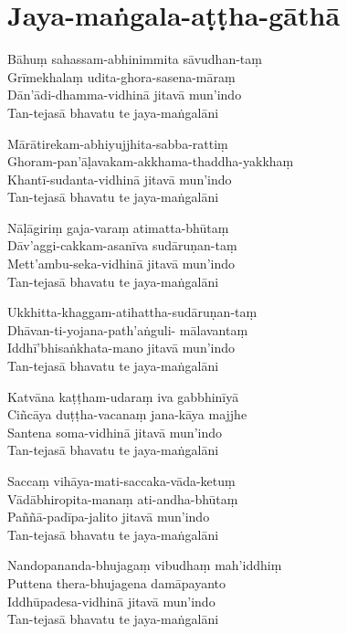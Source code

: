 
\clearpage

\chapter{Jaya-maṅgala-aṭṭha-gāthā}%


\begin{paritta}
Bāhuṃ sahassam-abhinimmita sāvudhan-taṃ\\
Grīmekhalaṃ udita-ghora-sasena-māraṃ\\
Dān'ādi-dhamma-vidhinā jitavā mun'indo\\
Tan-tejasā bhavatu te jaya-maṅgalāni

Mārātirekam-abhiyujjhita-sabba-rattiṃ\\
Ghoram-pan'āḷavakam-akkhama-thaddha-yakkhaṃ\\
Khantī-sudanta-vidhinā jitavā mun'indo\\
Tan-tejasā bhavatu te jaya-maṅgalāni

Nāḷāgiriṃ gaja-varaṃ atimatta-bhūtaṃ\\
Dāv'aggi-cakkam-asanīva sudāruṇan-taṃ\\
Mett'ambu-seka-vidhinā jitavā mun'indo\\
Tan-tejasā bhavatu te jaya-maṅgalāni

Ukkhitta-khaggam-atihattha-sudāruṇan-taṃ\\
Dhāvan-ti-yojana-path'aṅguli- mālavantaṃ\\
Iddhī'bhisaṅkhata-mano jitavā mun'indo\\
Tan-tejasā bhavatu te jaya-maṅgalāni

Katvāna kaṭṭham-udaraṃ iva gabbhinīyā\\
Ciñcāya duṭṭha-vacanaṃ jana-kāya majjhe\\
Santena soma-vidhinā jitavā mun'indo\\
Tan-tejasā bhavatu te jaya-maṅgalāni

Saccaṃ vihāya-mati-saccaka-vāda-ketuṃ\\
Vādābhiropita-manaṃ ati-andha-bhūtaṃ\\
Paññā-padīpa-jalito jitavā mun'indo\\
Tan-tejasā bhavatu te jaya-maṅgalāni

Nandopananda-bhujagaṃ vibudhaṃ mah'iddhiṃ\\
Puttena thera-bhujagena damāpayanto\\
Iddhūpadesa-vidhinā jitavā mun'indo\\
Tan-tejasā bhavatu te jaya-maṅgalāni


\end{paritta}
